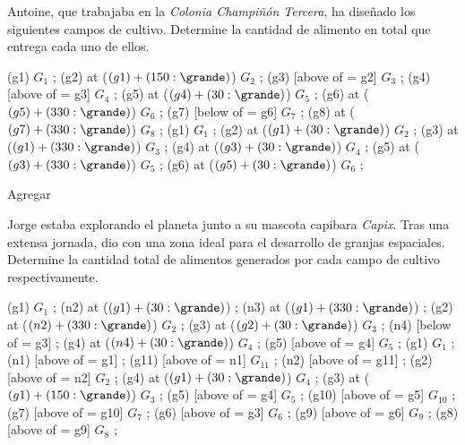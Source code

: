 \begin{probgrupal}{}{}{}

Antoine, que trabajaba en la \emph{Colonia Champiñón Tercera}, ha diseñado los siguientes campos de cultivo. Determine la cantidad de alimento en total %
que entrega cada uno de ellos.

\begin{center}
\cultivos
\granja (g1) {$G_1$} ;
\granja (g2) at ($(g1) + (150:\grande)$) {$G_2$} ;
\granja (g3) [above of = g2] {$G_3$} ;
\granja (g4) [above of = g3] {$G_4$} ;
\granja (g5) at ($(g4) + (30:\grande)$) {$G_5$} ;
\granja (g6) at ($(g5) + (330:\grande)$) {$G_6$} ;
\granja (g7) [below of = g6] {$G_7$} ;
\granja (g8) at ($(g7) + (330:\grande)$) {$G_8$} ;
\finfin
\hspace{15mm}
\cultivos
\granja (g1) {$G_1$} ;
\granja (g2) at ($(g1) + (30:\grande)$) {$G_2$} ;
\granja (g3) at ($(g1) + (330:\grande)$) {$G_3$} ;
\granja (g4) at ($(g3) + (30:\grande)$) {$G_4$} ;
\granja (g5) at ($(g3) + (330:\grande)$) {$G_5$} ;
\granja (g6) at ($(g5) + (30:\grande)$) {$G_6$} ;
\finfin
\end{center}

\end{probgrupal}

\begin{solgrupal}
Agregar
\end{solgrupal}



\begin{probgrupal}{}{}{}

Jorge estaba explorando el planeta junto a su mascota capibara \emph{Capix}. Tras una extensa jornada, dio con una zona ideal para %
el desarrollo de granjas espaciales. Determine la cantidad total de alimentos generados por cada campo de cultivo respectivamente.

\begin{center}
\cultivos
\granja (g1) {$G_1$} ;
\granjaN (n2) at ($(g1) + (30:\grande)$) {} ;
\granjaN (n3) at ($(g1) + (330:\grande)$) {} ;
\granja (g2) at ($(n2) + (330:\grande)$) {$G_2$} ;
\granja (g3) at ($(g2) + (30:\grande)$) {$G_3$} ;
\granjaN (n4) [below of = g3] {} ;
\granja (g4) at ($(n4) + (30:\grande)$) {$G_4$} ;
\granja (g5) [above of = g4] {$G_5$} ;
\finfin
\hspace{20mm}
\cultivos
\granja (g1) {$G_1$} ;
\granjaN (n1) [above of = g1] {} ;
\granja (g11) [above of = n1] {$G_{11}$} ;
\granjaN (n2) [above of = g11] {} ;
\granja (g2) [above of = n2] {$G_2$} ;
\granja (g4) at ($(g1) + (30:\grande)$) {$G_4$} ;
\granja (g3) at ($(g1) + (150:\grande)$) {$G_3$} ;
\granja (g5) [above of = g4] {$G_5$} ;
\granja (g10) [above of = g5] {$G_{10}$} ;
\granja (g7) [above of = g10] {$G_7$} ;
\granja (g6) [above of = g3] {$G_6$} ;
\granja (g9) [above of = g6] {$G_9$} ;
\granja (g8) [above of = g9] {$G_8$} ;
\finfin
\end{center}

\end{probgrupal}

